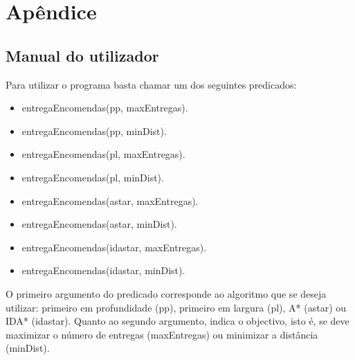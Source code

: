 \documentclass[a4paper]{article}
\begin{document}
\newpage
\appendix
\section{Apêndice}
\subsection{Manual do utilizador}

Para utilizar o programa basta chamar um dos seguintes predicados:
\begin{itemize}
	\item entregaEncomendas(pp, maxEntregas).
	\item entregaEncomendas(pp, minDist).
	\item entregaEncomendas(pl, maxEntregas).
	\item entregaEncomendas(pl, minDist).
	\item entregaEncomendas(astar, maxEntregas).
	\item entregaEncomendas(astar, minDist).
	\item entregaEncomendas(idastar, maxEntregas).
	\item entregaEncomendas(idastar, minDist).
\end{itemize}

O primeiro argumento do predicado corresponde ao algoritmo que se deseja utilizar: primeiro em profundidade (pp), primeiro em largura (pl), A* (astar) ou IDA* (idastar). Quanto ao segundo argumento, indica o objectivo, isto é, se deve maximizar o número de entregas (maxEntregas) ou minimizar a distância (minDist).
\end{document}
